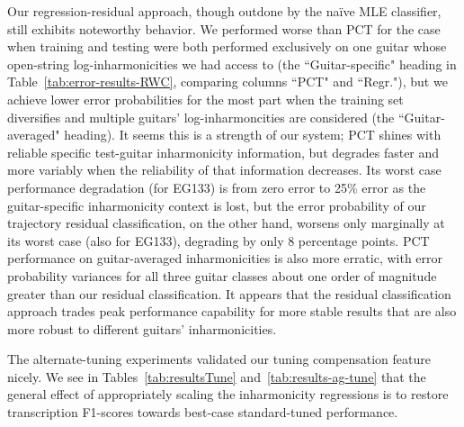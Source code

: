 \documentclass[12pt]{cmuthesis}
\begin{document}
Our regression-residual approach, though outdone by the na\"ive MLE classifier, still exhibits noteworthy behavior. We performed worse than PCT for the case when training and testing were both performed exclusively on one guitar whose open-string log-inharmonicities we had access to (the ``Guitar-specific" heading in Table~\ref{tab:error-results-RWC}, comparing columns ``PCT" and ``Regr."), but we achieve lower error probabilities for the most part when the training set diversifies and multiple guitars' log-inharmoncities are considered (the ``Guitar-averaged" heading). It seems this is a strength of our system; PCT shines with reliable specific test-guitar inharmonicity information, but degrades faster and more variably when the reliability of that information decreases. Its worst case performance degradation (for EG133) is from zero error to 25\% error as the guitar-specific inharmonicity context is lost, but the error probability of our trajectory residual classification, on the other hand, worsens only marginally at its worst case (also for EG133), degrading by only 8 percentage points. PCT performance on guitar-averaged inharmonicities is also more erratic, with error probability variances for all three guitar classes about one order of magnitude greater than our residual classification. It appears that the residual classification approach trades peak performance capability for more stable results that are also more robust to different guitars' inharmonicities.



The alternate-tuning experiments validated our tuning compensation feature nicely. We see in Tables~\ref{tab:resultsTune} and~\ref{tab:results-ag-tune} that the general effect of appropriately scaling the inharmonicity regressions is to restore transcription F1-scores towards best-case standard-tuned performance.
\end{document}
